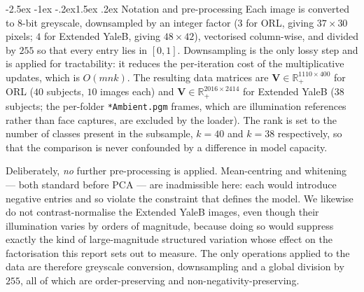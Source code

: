 \documentclass[12pt,a4paper]{article}
\makeatletter
\renewcommand\subsection{\@startsection{subsection}{2}{\z@}%
    {-2.5ex \@plus -1ex \@minus -.2ex}{1.5ex \@plus.2ex}%
    {\normalfont\fontsize{12}{14}\bfseries}}
\newcommand{\bV}{\bm{V}}
\makeatother
\begin{document}
\subsection{Notation and pre-processing}
\label{sec:preprocessing}
Each image is converted to 8-bit greyscale, downsampled by an integer factor
($3$ for ORL, giving $37 \times 30$ pixels; $4$ for Extended YaleB, giving
$48 \times 42$), vectorised column-wise, and divided by $255$ so that every
entry lies in $[0,1]$. Downsampling is the only lossy step and is applied for
tractability: it reduces the per-iteration cost of the multiplicative updates,
which is $O(mnk)$. The resulting data matrices are
$\bV \in \mathbb{R}^{1110 \times 400}_{+}$ for ORL ($40$ subjects, $10$ images
each) and $\bV \in \mathbb{R}^{2016 \times 2414}_{+}$ for Extended YaleB
($38$ subjects; the per-folder \texttt{*Ambient.pgm} frames, which are
illumination references rather than face captures, are excluded by the
loader). The rank is set to the number of classes present in the subsample,
$k = 40$ and $k = 38$ respectively, so that the comparison is never confounded
by a difference in model capacity.

Deliberately, \emph{no} further pre-processing is applied. Mean-centring and
whitening --- both standard before PCA --- are inadmissible here: each would
introduce negative entries and so violate the constraint that defines the
model. We likewise do not contrast-normalise the Extended YaleB images, even
though their illumination varies by orders of magnitude, because doing so
would suppress exactly the kind of large-magnitude structured variation whose
effect on the factorisation this report sets out to measure. The only
operations applied to the data are therefore greyscale conversion,
downsampling and a global division by $255$, all of which are order-preserving
and non-negativity-preserving.
\end{document}
